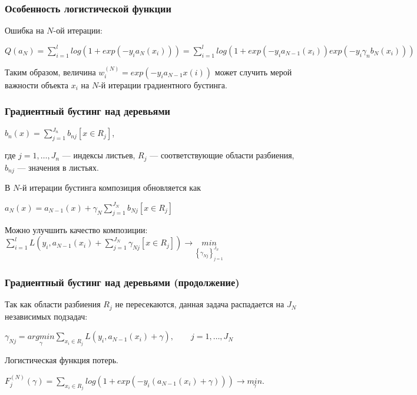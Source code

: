\documentclass[fleqn,pdf, 9pt, usenames, dvipsnames, unicode, hyperref={bookmarks=true,bookmarksopen=false, bookmarksnumbered}]{beamer}
\begin{document}

\begin{frame}\frametitle{Особенность логистической функции}

Ошибка на $N$-ой итерации:

$Q(a_N) = \sum_{i=1}^{l}log(1+exp(-y_ia_N(x_i))) = \sum_{i=1}^{l}log(1+exp(-y_ia_{N-1}(x_i))exp(-y_i \gamma_n b_N(x_i)))$

\hfill \break

Таким образом, величина $w_i^{(N)} = exp(-y_ia_{N-1}x(i))$ может случить мерой важности объекта $x_i$ на $N$-й итерации градиентного бустинга.

\end{frame}


\begin{frame}\frametitle{Градиентный бустинг над деревьями}

$b_n(x) = \sum_{j=1}^{J_n} b_{nj}[x\in R_j]$, 

где $j=1,\ldots,J_n$ --- индексы листьев, $R_{j}$ --- соответствующие области разбиения, $b_{nj}$ --- значения в листьях.
\hfill \break

В $N$-й итерации бустинга композиция обновляется как

$a_N(x) = a_{N-1}(x) + \gamma_N \sum_{j=1}^{J_N}b_{Nj}[x\in R_j]$

\hfill \break

Можно улучшить качество композиции:
$\sum_{i=1}^{l} L\left(y_i,a_{N-1}(x_i) + \sum_{j=1}^{J_N} \gamma_{Nj}[x\in R_j]\right) \rightarrow \underset{\left\{\gamma_{Nj}\right\}^{J_N}_{j=1}}{min}$

\end{frame}

\begin{frame}\frametitle{Градиентный бустинг над деревьями (продолжение)}

Так как области разбиения $R_j$ не пересекаются, данная задача распадается на $J_N$ независимых подзадач:

$\gamma_{Nj} = \underset{\gamma}{argmin} \sum_{x_i \in R_j} L(y_i, a_{N-1}(x_i) + \gamma), \qquad j=1,\ldots, J_N$

\hfill \break

Логистическая функция потерь.

$F_j^{(N)}(\gamma) = \sum_{x_i \in R_j} log(1 + exp(-y_i(a_{N-1}(x_i) + \gamma))) \rightarrow \underset{\gamma}{min}$.

\end{frame}
\end{document}
